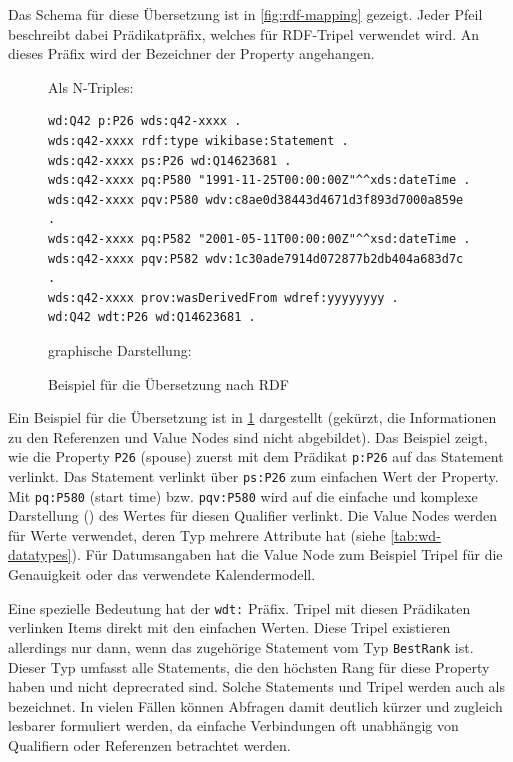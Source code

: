 Das Schema für diese Übersetzung ist in \cref{fig:rdf-mapping} gezeigt.
Jeder Pfeil beschreibt dabei Prädikatpräfix, welches für RDF-Tripel verwendet wird.
An dieses Präfix wird der Bezeichner der Property angehangen.

\begin{figure}
  Als N-Triples:
  
  \begin{lstlisting}[language=SPARQL]
wd:Q42 p:P26 wds:q42-xxxx .
wds:q42-xxxx rdf:type wikibase:Statement .
wds:q42-xxxx ps:P26 wd:Q14623681 .
wds:q42-xxxx pq:P580 "1991-11-25T00:00:00Z"^^xds:dateTime .
wds:q42-xxxx pqv:P580 wdv:c8ae0d38443d4671d3f893d7000a859e .
wds:q42-xxxx pq:P582 "2001-05-11T00:00:00Z"^^xsd:dateTime .
wds:q42-xxxx pqv:P582 wdv:1c30ade7914d072877b2db404a683d7c .
wds:q42-xxxx prov:wasDerivedFrom wdref:yyyyyyyy .
wd:Q42 wdt:P26 wd:Q14623681 .
\end{lstlisting}
  \vspace{0.3cm}

  graphische Darstellung:\vspace{0.15cm}

  \begin{adjustwidth}{-1.5cm}{-0.5cm}
    
  \end{adjustwidth}

  \caption{Beispiel für die Übersetzung nach RDF}
  \label{fig:rdf-mapping-sample}
\end{figure}

Ein Beispiel für die Übersetzung ist in \cref{fig:rdf-mapping-sample} dargestellt (gekürzt, die Informationen zu den Referenzen und Value Nodes sind nicht abgebildet).
Das Beispiel zeigt, wie die Property \verb|P26| (spouse) zuerst mit dem Prädikat \verb|p:P26| auf das Statement verlinkt.
Das Statement verlinkt über \verb|ps:P26| zum einfachen Wert der Property.
Mit \verb|pq:P580| (start time) bzw. \verb|pqv:P580| wird auf die einfache und komplexe Darstellung () des Wertes für diesen Qualifier verlinkt.
Die Value Nodes werden für Werte verwendet, deren Typ mehrere Attribute hat (siehe \cref{tab:wd-datatypes}).
Für Datumsangaben hat die Value Node zum Beispiel Tripel für die Genauigkeit oder das verwendete Kalendermodell.

Eine spezielle Bedeutung hat der \verb|wdt:| Präfix.
Tripel mit diesen Prädikaten verlinken Items direkt mit den einfachen Werten.
Diese Tripel existieren allerdings nur dann, wenn das zugehörige Statement vom Typ \verb|BestRank| ist.
Dieser Typ umfasst alle Statements, die den höchsten Rang für diese Property haben und nicht deprecrated sind.
Solche Statements und Tripel werden auch als  bezeichnet.
In vielen Fällen können Abfragen damit deutlich kürzer und zugleich lesbarer formuliert werden, da einfache Verbindungen oft unabhängig von Qualifiern oder Referenzen betrachtet werden.

